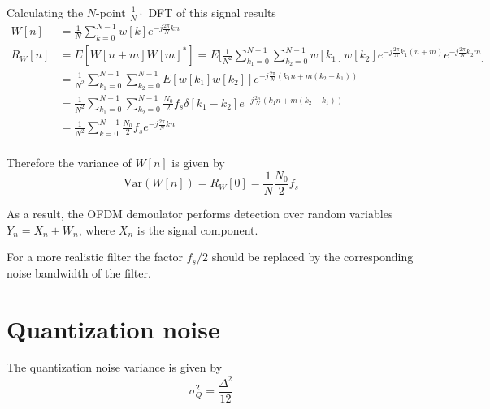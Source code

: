 \documentclass[a4paper]{article}
\begin{document}
Calculating the $N$-point $\frac{1}{N}\cdot$ DFT of this signal results
\begin{align}
W[n] &= \frac{1}{N}\sum_{k = 0}^{N-1}w[k]e^{-j\frac{2\pi}{N}kn} \\
R_W[n] & = E[W[n+m]W[m]^*] = E\bigg[\frac{1}{N^2}\sum_{k_1 = 0}^{N-1}\sum_{k_2 = 0}^{N-1}w[k_1]w[k_2]e^{-j\frac{2\pi}{N}k_1(n+m)}e^{-j\frac{2\pi}{N}k_2m}\bigg] \\
& = \frac{1}{N^2}\sum_{k_1 = 0}^{N-1}\sum_{k_2 = 0}^{N-1}E[w[k_1]w[k_2]]e^{-j\frac{2\pi}{N}(k_1n + m(k_2-k_1))} \\
& = \frac{1}{N^2}\sum_{k_1 = 0}^{N-1}\sum_{k_2 = 0}^{N-1}\frac{N_0}{2}f_s\delta[k_1-k_2]e^{-j\frac{2\pi}{N}(k_1n + m(k_2-k_1))} \\
& = \frac{1}{N^2}\sum_{k = 0}^{N-1}\frac{N_0}{2}f_se^{-j\frac{2\pi}{N}kn} \\
\end{align}

Therefore the variance of $W[n]$ is given by
\begin{equation}
\mathrm{Var}(W[n]) = R_W[0] = \frac{1}{N}\frac{N_0}{2}f_s
\end{equation}

As a result, the OFDM demoulator performs detection over random variables $Y_n = X_n + W_n$, where $X_n$ is the signal component.

For a more realistic filter the factor $f_s/2$ should be replaced by the corresponding noise bandwidth of the filter.


\section{Quantization noise}

The quantization noise variance is given by
\begin{equation}
\sigma^2_Q = \frac{\Delta^2}{12}
\end{equation}
\end{document}
